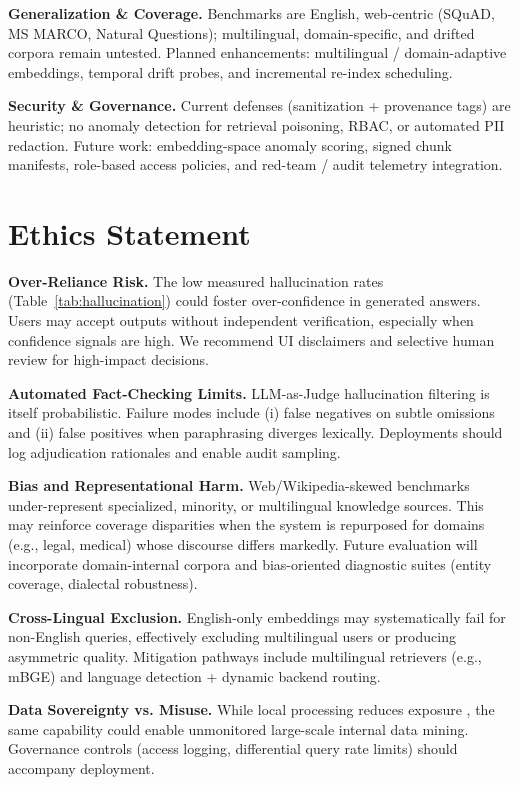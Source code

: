 \documentclass[11pt]{article}
\begin{document}
\textbf{Generalization \& Coverage.} Benchmarks are English, web-centric (SQuAD, MS MARCO, Natural Questions); multilingual, domain-specific, and drifted corpora remain untested. Planned enhancements: multilingual / domain-adaptive embeddings, temporal drift probes, and incremental re-index scheduling.

\textbf{Security \& Governance.} Current defenses (sanitization + provenance tags) are heuristic; no anomaly detection for retrieval poisoning, RBAC, or automated PII redaction. Future work: embedding-space anomaly scoring, signed chunk manifests, role-based access policies, and red-team / audit telemetry integration.

\section*{Ethics Statement}
\label{sec:ethics}

	\textbf{Over-Reliance Risk.} The low measured hallucination rates (Table~\ref{tab:hallucination}) could foster over-confidence in generated answers. Users may accept outputs without independent verification, especially when confidence signals are high. We recommend UI disclaimers and selective human review for high-impact decisions.

	\textbf{Automated Fact-Checking Limits.} LLM-as-Judge hallucination filtering \cite{llm_judge} is itself probabilistic. Failure modes include (i) false negatives on subtle omissions and (ii) false positives when paraphrasing diverges lexically. Deployments should log adjudication rationales and enable audit sampling.

	\textbf{Bias and Representational Harm.} Web/Wikipedia-skewed benchmarks under-represent specialized, minority, or multilingual knowledge sources. This may reinforce coverage disparities when the system is repurposed for domains (e.g., legal, medical) whose discourse differs markedly. Future evaluation will incorporate domain-internal corpora and bias-oriented diagnostic suites (entity coverage, dialectal robustness).

	\textbf{Cross-Lingual Exclusion.} English-only embeddings may systematically fail for non-English queries, effectively excluding multilingual users or producing asymmetric quality. Mitigation pathways include multilingual retrievers (e.g., mBGE) and language detection + dynamic backend routing.

	\textbf{Data Sovereignty vs. Misuse.} While local processing reduces exposure \cite{privacyinternational,edpb}, the same capability could enable unmonitored large-scale internal data mining. Governance controls (access logging, differential query rate limits) should accompany deployment.
\end{document}
